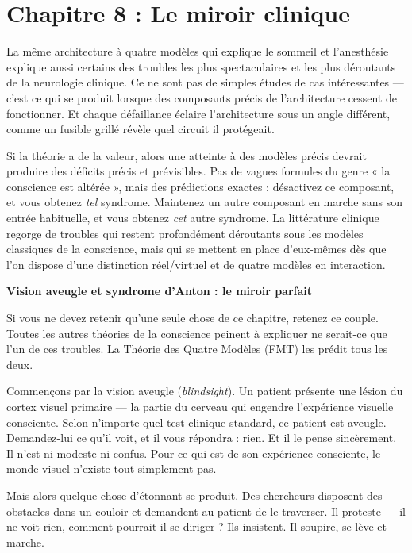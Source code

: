\documentclass[11pt, twoside, openright]{book}
\begin{document}
\chapter*{Chapitre 8 : Le miroir clinique}

La même architecture à quatre modèles qui explique le sommeil et l'anesthésie explique aussi certains des troubles les plus spectaculaires et les plus déroutants de la neurologie clinique. Ce ne sont pas de simples études de cas intéressantes --- c'est ce qui se produit lorsque des composants précis de l'architecture cessent de fonctionner. Et chaque défaillance éclaire l'architecture sous un angle différent, comme un fusible grillé révèle quel circuit il protégeait.

Si la théorie a de la valeur, alors une atteinte à des modèles précis devrait produire des déficits précis et prévisibles. Pas de vagues formules du genre « la conscience est altérée », mais des prédictions exactes : désactivez ce composant, et vous obtenez \textit{tel} syndrome. Maintenez un autre composant en marche sans son entrée habituelle, et vous obtenez \textit{cet} autre syndrome. La littérature clinique regorge de troubles qui restent profondément déroutants sous les modèles classiques de la conscience, mais qui se mettent en place d'eux-mêmes dès que l'on dispose d'une distinction réel/\allowbreak{}virtuel et de quatre modèles en interaction.

\textbf{Vision aveugle et syndrome d'Anton : le miroir parfait}

Si vous ne devez retenir qu'une seule chose de ce chapitre, retenez ce couple. Toutes les autres théories de la conscience peinent à expliquer ne serait-ce que l'un de ces troubles. La Théorie des Quatre Modèles (FMT) les prédit tous les deux.

Commençons par la vision aveugle (\textit{blindsight}). Un patient présente une lésion du cortex visuel primaire --- la partie du cerveau qui engendre l'expérience visuelle consciente. Selon n'importe quel test clinique standard, ce patient est aveugle. Demandez-lui ce qu'il voit, et il vous répondra : rien. Et il le pense sincèrement. Il n'est ni modeste ni confus. Pour ce qui est de son expérience consciente, le monde visuel n'existe tout simplement pas.

Mais alors quelque chose d'étonnant se produit. Des chercheurs disposent des obstacles dans un couloir et demandent au patient de le traverser. Il proteste --- il ne voit rien, comment pourrait-il se diriger ? Ils insistent. Il soupire, se lève et marche.
\end{document}
